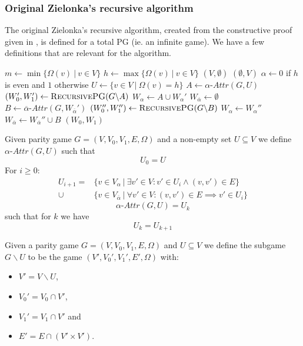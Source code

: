 \subsubsection{Original Zielonka's recursive algorithm}
The original Zielonka's recursive algorithm, created from the constructive proof given in \cite{ZIELONKA1998135}, is defined for a total PG (ie. an infinite game). We have a few definitions that are relevant for the algorithm.
\begin{algorithm}[h]
	\caption{$\textsc{RecursivePG}(\textit{PG } G = (V,V_0,V_1, E, \Omega))$}
	\begin{algorithmic}[1]
		\State $m \gets \min\{ \Omega(v)\ |\ v \in V\}$
		\State $h \gets\max\{ \Omega(v)\ |\ v \in V\}$
		\State \Return $(V,\emptyset)$
		\Else
		\State \Return $(\emptyset, V)$
		\EndIf
		\EndIf
		\State $\alpha \gets 0$ if $h$ is even and $1$ otherwise
		\State $U \gets \{v \in V\ |\ \Omega(v) = h\}$
		\State $A \gets \alpha\textit{-Attr}(G, U)$
		\State $(W_0', W_1') \gets \textsc{RecursivePG}(G \backslash A)$
		\State $W_\alpha \gets A \cup W_\alpha'$
		\State $W_{\overline{\alpha}} \gets \emptyset$
		\Else
		\State $B \gets \overline{\alpha}\textit{-Attr}(G,W_{\overline{\alpha}}')$
		\State $(W_0'', W_1'') \gets \textsc{RecursivePG}(G \backslash B)$
		\State $W_\alpha \gets W_\alpha''$
		\State $W_{\overline{\alpha}} \gets W_{\overline{\alpha}}'' \cup B$
		\EndIf
		\State \Return $(W_0, W_1)$
	\end{algorithmic}
\end{algorithm}

\begin{definition}\cite{ZIELONKA1998135}
	\label{def_attr}Given parity game $G = (V,V_0,V_1,E,\Omega)$ and a non-empty set $U \subseteq V$ we define $\alpha\textit{-Attr}(G,U)$ such that
	\[U_0 = U \]
	For $i \geq 0$:
	\begin{align*}
	U_{i+1} = &\{v \in V_\alpha\ |\ \exists v' \in V : v' \in U_i \wedge (v,v') \in E \}\\
	\cup &\{v \in V_{\overline{\alpha}}\ |\ \forall v' \in V :(v,v') \in E \implies v' \in U_i \}
	\end{align*}
	\[\alpha\textit{-Attr}(G,U) = U_k \]
	such that for $k$ we have
	\[U_k = U_{k+1} \]
\end{definition}
\begin{definition}\cite{ZIELONKA1998135}
\label{def_org_subgame}
Given a parity game $G = (V,V_0,V_1, E,\Omega)$ and $U \subseteq V$ we define the subgame $G \backslash U$ to be the game $(V', V_0', V_1', E', \Omega)$ with:
\begin{itemize}
	\item $V' = V \backslash U$,
	\item $V_0' = V_0 \cap V'$,
	\item $V_1' = V_1 \cap V'$ and
	\item $E' = E \cap (V' \times V')$.
\end{itemize}
\end{definition}

